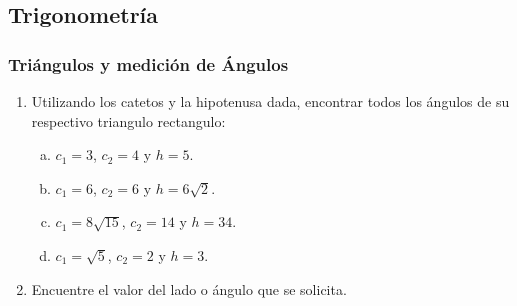 \subsection{Trigonometría}
\subsubsection{Triángulos y medición de Ángulos}
\begin{enumerate}
	\item Utilizando los catetos y la hipotenusa dada, encontrar todos los ángulos de su respectivo triangulo rectangulo:
	\begin{enumerate}[a)]
		\item $c_1 =3$, $c_2 =4$ y $h=5$.
		\item $c_1 =6$, $c_2 =6$ y $h=6\sqrt{2}$.
		\item $c_1 =8\sqrt{15}$, $c_2 =14$ y $h=34$.
		\item $c_1 =\sqrt{5}$, $c_2 =2$ y $h=3$.
	\end{enumerate}
	\item Encuentre el valor del lado o ángulo que se solicita.
	\begin{enumerate}[a)]
\end{enumerate}
\end{enumerate}
